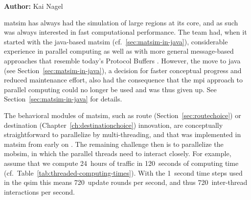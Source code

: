 \hfill \textbf{Author:} Kai Nagel


\gls{matsim} has always had the simulation of large regions at its core, and as such was always interested in fast  computational performance.  The team had, when it started with the \gls{java}-based \gls{matsim} (cf.~\ref{sec:matsim-in-java}), considerable experience in parallel computing \citep{NagelSchleicher1994Microscopictrafficmodeling,RickertNagel1999hpcn99,NagelRickert2001parallel,CetinBurriNagel2003queue} as well as with more general message-based approaches \citep{GloorNagel2005ped-att04-birkh} that resemble today's Protocol Buffers 
\citep[][]{ProtocolBuffers_Webpage_2015}.
%
However, the move to \gls{java} (see Section~\ref{sec:matsim-in-java}), a decision for faster conceptual progress and reduced maintenance effort, also had the consequence that the \gls{mpi} approach to parallel computing could no longer be used and was thus given up.  See Section~\ref{sec:matsim-in-java} for details.



The behavioral modules of \gls{matsim}, such as route (Section~\ref{sec:routechoice}) or destination (Chapter~\ref{ch:destinationchoice}) innovation, are conceptually straightforward to parallelize by multi-threading, and that was implemented in \gls{matsim} from early on \citep[][see Section~\ref{sec:using-parallel-computing} how to use this]{BalmerEtc2008matsim-arch-perf-MAS-TT}.  The remaining challenge then is to parallelize the \gls{mobsim}, in which the parallel threads need to interact closely.  For example, assume that we compute 24~hours of traffic in 120~seconds of computing time (cf.~Table~\ref{tab:threaded-computing-times}).  With the 1~second time steps used in the \gls{qsim} this means 720~update rounds per second, and thus 720~inter-thread interactions per second.

